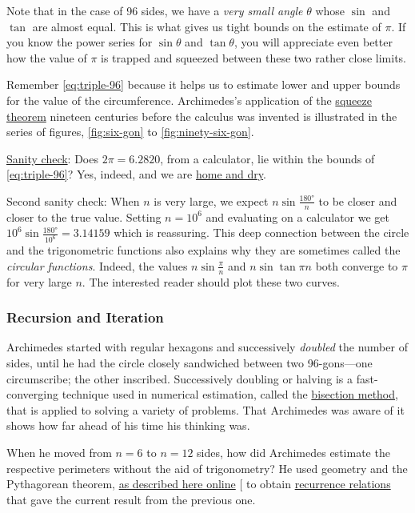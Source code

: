 \documentclass[
  a4paper,
]{article}
\begin{document}
Note that in the case of 96 sides, we have a \emph{very small angle}
\(\theta\) whose \(\sin\) and \(\tan\) are almost equal. This is what
gives us tight bounds on the estimate of \(\pi\). If you know the power
series for \(\sin\theta\) and \(\tan\theta\), you will appreciate even
better how the value of \(\pi\) is trapped and squeezed between these
two rather close limits.

Remember \cref{eq:triple-96} because it helps us to estimate lower and
upper bounds for the value of the circumference. Archimedes's
application of the
\href{https://en.wikipedia.org/wiki/Squeeze_theorem}{squeeze theorem}
nineteen centuries before the calculus was invented is illustrated in
the series of figures, \cref{fig:six-gon} to \cref{fig:ninety-six-gon}.

\href{https://en.wiktionary.org/wiki/sanity_check}{Sanity check}: Does
\(2\pi = 6.2820\), from a calculator, lie within the bounds of
\cref{eq:triple-96}? Yes, indeed, and we are
\href{https://dictionary.cambridge.org/dictionary/english/be-home-and-dry}{home
and dry}.

Second sanity check: When \(n\) is very large, we expect
\(n\sin\frac{180°}{n}\) to be closer and closer to the true value.
Setting \(n = 10^6\) and evaluating on a calculator we get
\(10^6\sin\frac{180°}{10^6} = 3.14159\) which is reassuring. This deep
connection between the circle and the trigonometric functions also
explains why they are sometimes called the \emph{circular functions}.
Indeed, the values \(n\sin\frac{\pi}{n}\) and \(n\sin\tan{\pi}{n}\) both
converge to \(\pi\) for very large \(n\). The interested reader should
plot these two curves.

\subsubsection{Recursion and Iteration}\label{recursion-and-iteration}

Archimedes started with regular hexagons and successively \emph{doubled}
the number of sides, until he had the circle closely sandwiched between
two 96-gons---one circumscribe; the other inscribed. Successively
doubling or halving is a fast-converging technique used in numerical
estimation, called the
\href{https://en.wikipedia.org/wiki/Bisection_method}{bisection method},
that is applied to solving a variety of problems. That Archimedes was
aware of it shows how far ahead of his time his thinking was.

When he moved from \(n=6\) to \(n = 12\) sides, how did Archimedes
estimate the respective perimeters without the aid of trigonometry? He
used geometry and the Pythagorean theorem,
\href{https://nonagon.org/ExLibris/archimedes-pi}{as described here
online} {[}\citeproc{ref-bertrand2014}{1}{]} to obtain
\href{https://en.wikipedia.org/wiki/Recurrence_relation}{recurrence
relations} that gave the current result from the previous one.
\end{document}
